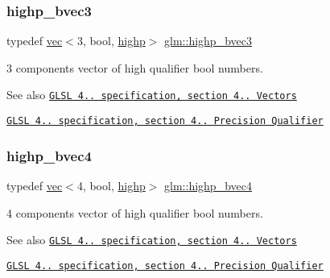 \subsubsection{\texorpdfstring{highp\+\_\+bvec3}{highp\_bvec3}}
{\footnotesize\ttfamily typedef \hyperlink{structglm_1_1vec}{vec}$<$3, bool, \hyperlink{namespaceglm_a36ed105b07c7746804d7fdc7cc90ff25ac6f7eab42eacbb10d59a58e95e362074}{highp}$>$ \hyperlink{group__core__precision_ga0e3365e13160aa93d2a9c68529a013ce}{glm\+::highp\+\_\+bvec3}}

3 components vector of high qualifier bool numbers.

\begin{DoxySeeAlso}{See also}
\href{http://www.opengl.org/registry/doc/GLSLangSpec.4.20.8.pdf}{\tt G\+L\+SL 4.. specification, section 4.. Vectors} 

\href{http://www.opengl.org/registry/doc/GLSLangSpec.4.20.8.pdf}{\tt G\+L\+SL 4.. specification, section 4.. Precision Qualifier} 
\end{DoxySeeAlso}
\mbox{\label{group__core__precision_gaa99e0301060bf06e7750c1c3591b6b4e}} 
\subsubsection{\texorpdfstring{highp\+\_\+bvec4}{highp\_bvec4}}
{\footnotesize\ttfamily typedef \hyperlink{structglm_1_1vec}{vec}$<$4, bool, \hyperlink{namespaceglm_a36ed105b07c7746804d7fdc7cc90ff25ac6f7eab42eacbb10d59a58e95e362074}{highp}$>$ \hyperlink{group__core__precision_gaa99e0301060bf06e7750c1c3591b6b4e}{glm\+::highp\+\_\+bvec4}}

4 components vector of high qualifier bool numbers.

\begin{DoxySeeAlso}{See also}
\href{http://www.opengl.org/registry/doc/GLSLangSpec.4.20.8.pdf}{\tt G\+L\+SL 4.. specification, section 4.. Vectors} 

\href{http://www.opengl.org/registry/doc/GLSLangSpec.4.20.8.pdf}{\tt G\+L\+SL 4.. specification, section 4.. Precision Qualifier} 
\end{DoxySeeAlso}
\mbox{\label{group__core__precision_ga10defb0dfd989f948d6783e2ca3889d3}} 
